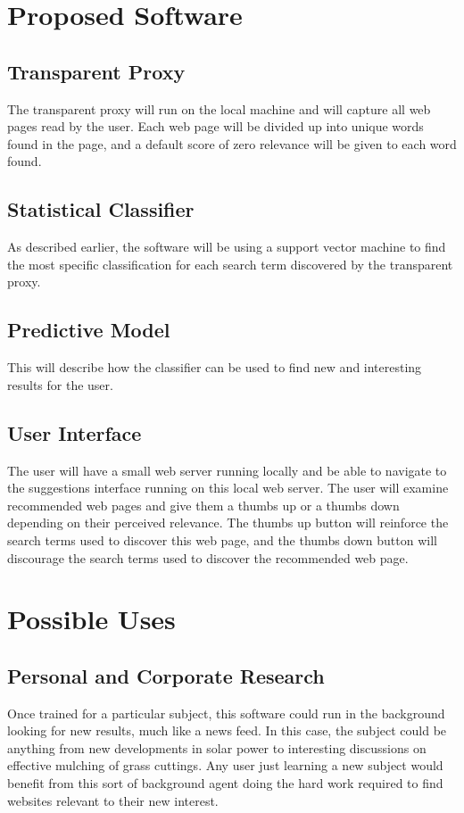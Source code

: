 \documentclass[12pt]{article}
\begin{document}
\section{Proposed Software}
\subsection{Transparent Proxy}
The transparent proxy will run on the local machine and will capture all web pages read by the user. Each web
page will be divided up into unique words found in the page, and a default score of zero relevance will be
given to each word found.
\subsection{Statistical Classifier}
As described earlier, the software will be using a support vector machine to find the most specific
classification for each search term discovered by the transparent proxy.
\subsection{Predictive Model}
This will describe how the classifier can be used to find new and interesting results for the user.
\subsection{User Interface}
The user will have a small web server running locally and be able to navigate to the suggestions interface
running on this local web server. The user will examine recommended web pages and give them a thumbs up or a
thumbs down depending on their perceived relevance. The thumbs up button will reinforce the search terms used
to discover this web page, and the thumbs down button will discourage the search terms used to discover the
recommended web page.
\section{Possible Uses}
\subsection{Personal and Corporate Research}
Once trained for a particular subject, this software could run in the background looking for new results, much
like a news feed. In this case, the subject could be anything from new developments in solar power to
interesting discussions on effective mulching of grass cuttings. Any user just learning a new subject would
benefit from this sort of background agent doing the hard work required to find websites relevant to their new interest.
\end{document}
